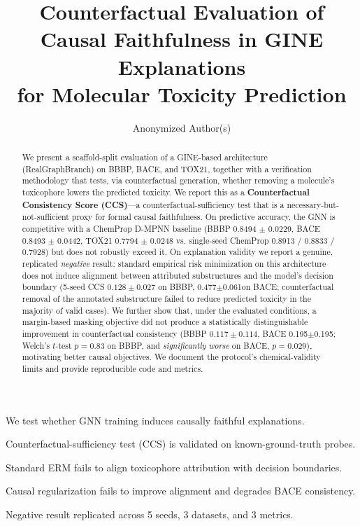 \documentclass[a4paper,fleqn]{cas-dc}
\newcommand{\BBBPauc}{0.8494}
\newcommand{\BBBPaucsd}{0.0229}
\newcommand{\BACEauc}{0.8493}
\newcommand{\BACEaucsd}{0.0442}
\newcommand{\TOXauc}{0.7794}
\newcommand{\TOXaucsd}{0.0248}
\newcommand{\ChemBBBP}{0.8913}
\newcommand{\ChemBACE}{0.8833}
\newcommand{\ChemTOX}{0.7928}
\newcommand{\BACEcausalstd}{0.477}
\newcommand{\BACEcausalstdsd}{0.061} %
\newcommand{\BACEcausalreg}{0.195}
\newcommand{\BACEcausalregsd}{0.195} %
\begin{document}
\let\WriteBookmarks\relax
\def\floatpagepagefraction{1}
\def\textpagefraction{.001}

\title [mode = title]{Counterfactual Evaluation of Causal Faithfulness in GINE Explanations\\for Molecular Toxicity Prediction}

\author[1]{Anonymized Author(s)}

\begin{abstract}
We present a scaffold-split evaluation of a GINE-based architecture (RealGraphBranch) on BBBP, BACE, and TOX21, together with a verification methodology that tests, via counterfactual generation, whether removing a molecule's toxicophore lowers the predicted toxicity. We report this as a \textbf{Counterfactual Consistency Score (CCS)}---a counterfactual-sufficiency test that is a necessary-but-not-sufficient proxy for formal causal faithfulness.
On predictive accuracy, the GNN is competitive with a ChemProp D-MPNN baseline (BBBP \BBBPauc{} $\pm$ \BBBPaucsd, BACE \BACEauc{} $\pm$ \BACEaucsd, TOX21 \TOXauc{} $\pm$ \TOXaucsd{} vs. single-seed ChemProp \ChemBBBP{} / \ChemBACE{} / \ChemTOX) but does not robustly exceed it. On explanation validity we report a genuine, replicated \emph{negative} result: standard empirical risk minimization on this architecture does not induce alignment between attributed substructures and the model's decision boundary (5-seed CCS $0.128\pm0.027$ on BBBP, \BACEcausalstd$\pm$\BACEcausalstdsd on BACE; counterfactual removal of the annotated substructure failed to reduce predicted toxicity in the majority of valid cases). We further show that, under the evaluated conditions, a margin-based masking objective did not produce a statistically distinguishable improvement in counterfactual consistency (BBBP $0.117\pm0.114$, BACE \BACEcausalreg$\pm$\BACEcausalregsd; Welch's $t$-test $p=0.83$ on BBBP, and \emph{significantly worse} on BACE, $p=0.029$), motivating better causal objectives. We document the protocol's chemical-validity limits and provide reproducible code and metrics.
\end{abstract}

\begin{highlights}
\item We test whether GNN training induces causally faithful explanations.
\item Counterfactual-sufficiency test (CCS) is validated on known-ground-truth probes.
\item Standard ERM fails to align toxicophore attribution with decision boundaries.
\item Causal regularization fails to improve alignment and degrades BACE consistency.
\item Negative result replicated across 5 seeds, 3 datasets, and 3 metrics.
\end{highlights}
\end{document}
